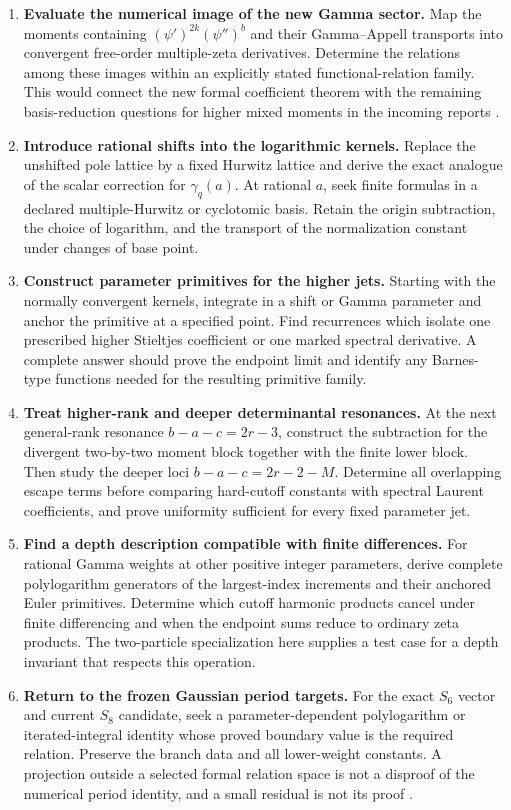 \begin{enumerate}
\item \textbf{Evaluate the numerical image of the new Gamma sector.}
Map the moments containing $(\psi')^{2k}(\psi'')^b$ and their
Gamma--Appell transports into convergent free-order multiple-zeta
derivatives. Determine the relations among these images within an
explicitly stated functional-relation family. This would connect the
new formal coefficient theorem with the remaining basis-reduction questions for
higher mixed moments in the incoming reports \cite{DPL,PTI}.

\item \textbf{Introduce rational shifts into the logarithmic kernels.}
Replace the unshifted pole lattice by a fixed Hurwitz lattice and
derive the exact analogue of the scalar correction for
$\gamma_q(a)$. At rational $a$, seek finite formulas in a declared
multiple-Hurwitz or cyclotomic basis. Retain the origin subtraction,
the choice of logarithm, and the transport of the normalization
constant under changes of base point.

\item \textbf{Construct parameter primitives for the higher jets.}
Starting with the normally convergent kernels, integrate in a shift
or Gamma parameter and anchor the primitive at a specified point.
Find recurrences which isolate one prescribed higher Stieltjes
coefficient or one marked spectral derivative. A complete answer
should prove the endpoint limit and identify any Barnes-type
functions needed for the resulting primitive family.

\item \textbf{Treat higher-rank and deeper determinantal resonances.}
At the next general-rank resonance $b-a-c=2r-3$, construct the
subtraction for the divergent two-by-two moment block together with
the finite lower block. Then study the deeper loci
$b-a-c=2r-2-M$. Determine all overlapping escape terms before
comparing hard-cutoff constants with spectral Laurent coefficients,
and prove uniformity sufficient for every fixed parameter jet.

\item \textbf{Find a depth description compatible with finite differences.}
For rational Gamma weights at other positive integer parameters,
derive complete polylogarithm generators of the largest-index
increments and their anchored Euler primitives. Determine which
cutoff harmonic products cancel under finite differencing and when
the endpoint sums reduce to ordinary zeta products. The two-particle
specialization here supplies a test case for a depth invariant that
respects this operation.

\item \textbf{Return to the frozen Gaussian period targets.}
For the exact $S_6$ vector and current $S_8$ candidate, seek a
parameter-dependent polylogarithm or iterated-integral identity whose
proved boundary value is the required relation. Preserve the branch
data and all lower-weight constants. A projection outside a selected
formal relation space is not a disproof of the numerical period
identity, and a small residual is not its proof \cite{Repo}.
\end{enumerate}
